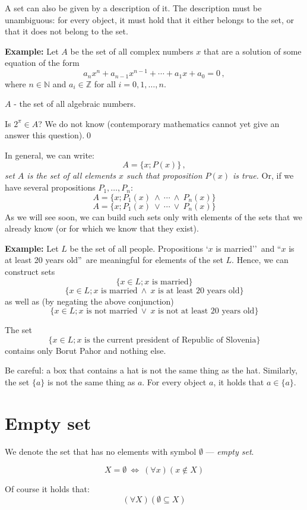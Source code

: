 \documentclass[11pt,paper=b5,footinclude,headinclude]{scrbook} %
\def\ali {{~\vee~}}
\def\inn {{~\wedge~}}
\def\cee {{~\Leftrightarrow~}}
\theoremstyle{remark}
\theoremstyle{definition} %
\theoremstyle{theorem} %
\begin{document}
\medskip
A set can also be given by a description of it. The description must be unambiguous:
for every object, it must hold that it either belongs to the set, or that it does not belong to the set.

\medskip
\textbf{ Example:} Let $A$ be the set of all complex numbers  $x$ that are a solution of some equation of the form
$$a_nx^n+a_{n-1}x^{n-1}+\cdots+a_1x+a_0 = 0\,,$$
where $n\in \mathbb{N}$ and $a_i\in \mathbb{Z}$ for all $i= 0,1,\ldots, n$.

\medskip
$A$ - the set of all algebraic numbers.

Is $2^{\pi}\in A$? We do not know (contemporary mathematics cannot yet give an answer this question).\qed

\medskip
In general, we can write:
$$A = \{x; P(x)\}\,,$$
{\em set $A$ is the set of all elements $x$ such that proposition $P(x)$ is true.}
Or, if we have several propositions $P_1,\ldots, P_n$:
$$A = \{x; P_1(x)\inn \cdots\inn P_n(x)\}$$
$$A = \{x; P_1(x)\ali \cdots\ali P_n(x)\}$$
As we will see soon, we can build such sets only with elements of the sets that we already know (or for which we know that they exist).

\medskip
\textbf{ Example:}
Let  $L$ be the set of all people. Propositions `$x$ is married''~and ``$x$ is at least 20 years old''~are meaningful for elements of the set $L$.
Hence, we can construct sets
      $$\{x\in L; x \textrm{ is married}\}$$
      $$\{x\in L; x \textrm{ is married} \inn x \textrm{ is at least 20 years old}\}$$
as well as (by negating the above conjunction)
      $$\{x\in L; x \textrm{ is not married} \ali x \textrm{ is not at least 20 years old}\}$$

The set
      $$\{x\in L; x \textrm{ is the current president of Republic of Slovenia}\}$$
contains only Borut Pahor and nothing else.

\medskip
Be careful: a box that contains a hat is not the same thing as the hat.
Similarly, the set
$\{a\}$ is not the same thing as $a$. For every object $a$, it holds that $a\in \{a\}$.

\section{Empty set}
We denote the set that has no elements with symbol $\emptyset$ --- {\em empty set}.

$$X = \emptyset \cee (\forall x)(x\not\in X)$$

Of course it holds that:
$$(\forall X) (\emptyset \subseteq X)$$
\end{document}
